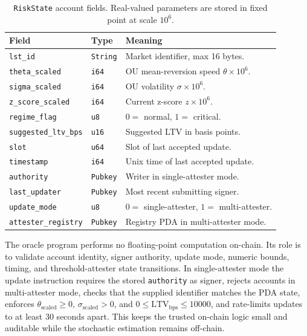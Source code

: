 \documentclass[aps,prx,reprint,nofootinbib,longbibliography]{revtex4-2}
\newcommand{\bps}{\mathrm{bps}}
\begin{document}
\begin{table}[t]
\caption{\label{tab:riskstate}\texttt{RiskState} account fields. Real-valued
parameters are stored in fixed point at scale $10^6$.}
\centering
\begin{tabular}{lll}
\toprule
Field & Type & Meaning \\
\midrule
\texttt{lst\_id} & \texttt{String} & Market identifier, max 16 bytes. \\
\texttt{theta\_scaled} & \texttt{i64} & OU mean-reversion speed $\theta \times 10^6$. \\
\texttt{sigma\_scaled} & \texttt{i64} & OU volatility $\sigma \times 10^6$. \\
\texttt{z\_score\_scaled} & \texttt{i64} & Current z-score $z \times 10^6$. \\
\texttt{regime\_flag} & \texttt{u8} & $0=$ normal, $1=$ critical. \\
\texttt{suggested\_ltv\_bps} & \texttt{u16} & Suggested LTV in basis points. \\
\texttt{slot} & \texttt{u64} & Slot of last accepted update. \\
\texttt{timestamp} & \texttt{i64} & Unix time of last accepted update. \\
\texttt{authority} & \texttt{Pubkey} & Writer in single-attester mode. \\
\texttt{last\_updater} & \texttt{Pubkey} & Most recent submitting signer. \\
\texttt{update\_mode} & \texttt{u8} & $0=$ single-attester, $1=$ multi-attester. \\
\texttt{attester\_registry} & \texttt{Pubkey} & Registry PDA in multi-attester mode. \\
\bottomrule
\end{tabular}
\end{table}

The oracle program performs no floating-point computation on-chain. Its role is to
validate account identity, signer authority, update mode, numeric bounds, timing,
and threshold-attester state transitions. In single-attester mode the update
instruction requires the stored \texttt{authority} as signer, rejects accounts in
multi-attester mode, checks that the supplied identifier matches the PDA state,
enforces $\theta_{\mathrm{scaled}}\geq 0$, $\sigma_{\mathrm{scaled}}>0$, and
$0\leq \mathrm{LTV}_{\bps}\leq 10000$, and rate-limits updates to at least 30
seconds apart. This keeps the trusted on-chain logic small and auditable while the
stochastic estimation remains off-chain.
\end{document}
